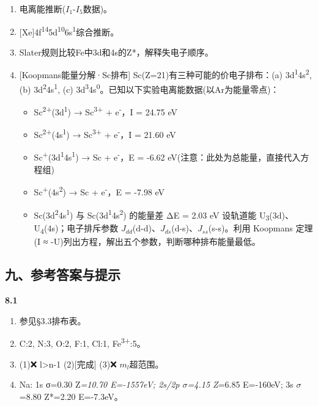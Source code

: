 \begin{enumerate}
\def\labelenumi{\arabic{enumi}.}
\setcounter{enumi}{8}
\tightlist
\item
  电离能推断(\(I_1\)-\(I_5\)数据)。
\item
  {[}Xe{]}4f\textsuperscript{14}5d\textsuperscript{10}6s\textsuperscript{1}综合推断。
\item
  Slater规则比较Fe中3d和4s的Z*，解释失电子顺序。
\item
  {[}Koopmans能量分解·Sc排布{]} Sc(Z=21)有三种可能的价电子排布：(a) 3d\textsuperscript{1}4s\textsuperscript{2}, (b) 3d\textsuperscript{2}4s\textsuperscript{1}, (c) 3d\textsuperscript{3}4s\textsuperscript{0}。已知以下实验电离能数据(以Ar为能量零点)：

  \begin{itemize}
  \tightlist
  \item
    Sc\textsuperscript{2+}(3d\textsuperscript{1}) → Sc\textsuperscript{3+} + e\textsuperscript{-}，I = 24.75 eV
  \item
    Sc\textsuperscript{2+}(4s\textsuperscript{1}) → Sc\textsuperscript{3+} + e\textsuperscript{-}，I = 21.60 eV
  \item
    Sc\textsuperscript{+}(3d\textsuperscript{1}4s\textsuperscript{1}) → Sc + e\textsuperscript{-}，E = -6.62 eV(注意：此处为总能量，直接代入方程组)
  \item
    Sc\textsuperscript{+}(4s\textsuperscript{2}) → Sc + e\textsuperscript{-}，E = -7.98 eV
  \item
    Sc(3d\textsuperscript{2}4s\textsuperscript{1}) 与 Sc(3d\textsuperscript{1}4s\textsuperscript{2}) 的能量差 ΔE = 2.03 eV
    设轨道能 U\textsubscript{3}(3d)、U\textsubscript{4}(4s)；电子排斥参数 \(J_{dd}\)(d-d)、\(J_{ds}\)(d-s)、\(J_{ss}\)(s-s)。利用 Koopmans 定理(I ≈ -U)列出方程，解出五个参数，判断哪种排布能量最低。
  \end{itemize}
\end{enumerate}

\subsection{九、参考答案与提示}\label{ux4e5dux53c2ux8003ux7b54ux6848ux4e0eux63d0ux793a}

\textbf{8.1}

\begin{enumerate}
\def\labelenumi{\arabic{enumi}.}
\item
  参见§3.3排布表。
\item
  C:2, N:3, O:2, F:1, Cl:1, Fe\textsuperscript{3+}:5。
\item
  (1)❌ l\textgreater n-1 (2){[}完成{]} (3)❌ \(m_l\)超范围。
\item
  Na: 1s σ=0.30 Z\emph{=10.70 E=-1557eV; 2s/2p \(\sigma\)=4.15 Z}=6.85 E=-160eV; 3s \(\sigma\)=8.80 Z*=2.20 E=-7.3eV。
\end{enumerate}

